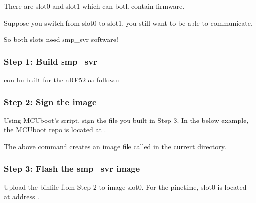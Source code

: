 \documentclass[letterpaper,10pt,english]{sphinxmanual}
\begin{document}
There are slot0 and slot1 which can both contain firmware.

Suppose you switch from slot0 to slot1, you still want to be able to communicate.

So both slots need smp\_svr software!


\subsubsection{Step 1: Build smp\_svr}
\label{\detokenize{fota/smp_svr:step-1-build-smp-svr}}
 can be built for the nRF52 as follows:



\subsubsection{Step 2: Sign the image}
\label{\detokenize{fota/smp_svr:step-2-sign-the-image}}
Using MCUboot’s  script, sign the 
file you built in Step 3. In the below example, the MCUboot repo is located at
.

\begin{sphinxVerbatim}[commandchars=\\\{\}]
\end{sphinxVerbatim}

The above command creates an image file called  in the
current directory.


\subsubsection{Step 3: Flash the smp\_svr image}
\label{\detokenize{fota/smp_svr:step-3-flash-the-smp-svr-image}}
Upload the bin\sphinxhyphen{}file from Step 2 to image slot\sphinxhyphen{}0.
For the pinetime, slot\sphinxhyphen{}0 is located at address .
\end{document}
